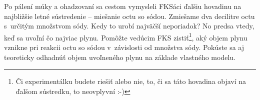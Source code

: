 Po pálení múky a ohadzovaní sa cestom vymysleli FKSáci ďalšiu hovadinu
na najbližšie letné sústredenie -- miešanie octu so sódou. Zmiešame dva
decilitre octu s~určitým množstvom sódy. Kedy to urobí najväčší
neporiadok? No predsa vtedy, keď sa uvoľní čo najviac plynu. Pomôžte
vedúcim FKS zistiť\footnote{Či experimentálku budete riešiť alebo nie, to, či sa táto hovadina objaví na ďalšom sústredku, to neovplyvní :-)},
aký objem plynu vznikne pri reakcii octu so sódou v~závislosti od
množstva sódy. Pokúste sa aj teoreticky odhadnúť objem uvoľneného plynu
na základe vlastného modelu.
